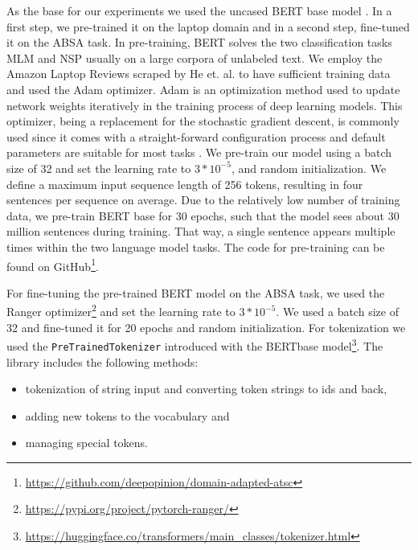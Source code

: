 As the base for our experiments we used the uncased BERT base model \cite{DBLP:journals/corr/abs-1810-04805}. In a first step, we pre-trained it on the laptop domain and in a second step, fine-tuned it on the ABSA task. In pre-training, BERT solves the two classification tasks MLM and NSP usually on a large corpora of unlabeled text. We employ the Amazon Laptop Reviews scraped by He et. al. to have sufficient training data \cite{he2016ups} and used the Adam optimizer. Adam is an optimization method used to update network weights iteratively in the training process of deep learning models. This optimizer, being a replacement for the stochastic gradient descent, is commonly used since it comes with a straight-forward configuration process and default parameters are suitable for most tasks \cite{kingma2014adam}. We pre-train our model using a batch size of 32 and set the learning rate to $3 * 10^{-5}$, and random initialization.
We define a maximum input sequence length of 256 tokens, resulting in four sentences per sequence on average.  Due to the relatively low number of training data, we pre-train BERT base for 30 epochs, such that the model sees about 30 million sentences during training. That way, a single sentence appears multiple times within the two language model tasks. The code for pre-training can be found on GitHub\footnote{\url{https://github.com/deepopinion/domain-adapted-atsc}}.

For fine-tuning the pre-trained BERT model on the ABSA task, we used the Ranger optimizer\footnote{\url{https://pypi.org/project/pytorch-ranger/}} and set the learning rate to $3 * 10^{-5}$. We used a batch size of 32 and fine-tuned it for 20 epochs and random initialization. 
For tokenization we used the \texttt{PreTrainedTokenizer} introduced with the BERTbase model\footnote{\url{https://huggingface.co/transformers/main\_classes/tokenizer.html}}. The library includes the following methods:
\begin{itemize}
\item tokenization of string input and converting token strings to ids and back,
\item adding new tokens to the vocabulary and
\item managing special tokens.
\end{itemize}


